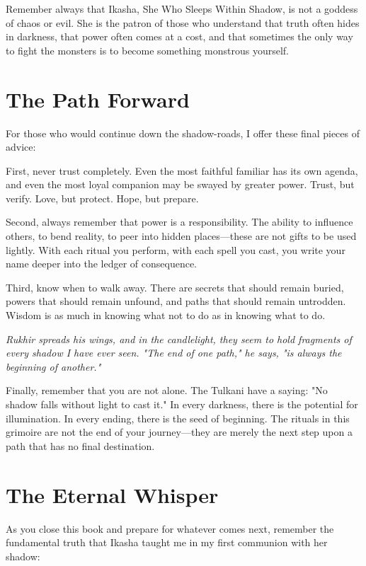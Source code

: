 \documentclass[12pt,twoside]{book}
\newcommand{\shadow}[1]{\textit{#1}}
\begin{document}
Remember always that Ikasha, She Who Sleeps Within Shadow, is not a goddess of chaos or evil. She is the patron of those who understand that truth often hides in darkness, that power often comes at a cost, and that sometimes the only way to fight the monsters is to become something monstrous yourself.

\section*{The Path Forward}

For those who would continue down the shadow-roads, I offer these final pieces of advice:

First, never trust completely. Even the most faithful familiar has its own agenda, and even the most loyal companion may be swayed by greater power. Trust, but verify. Love, but protect. Hope, but prepare.

Second, always remember that power is a responsibility. The ability to influence others, to bend reality, to peer into hidden places—these are not gifts to be used lightly. With each ritual you perform, with each spell you cast, you write your name deeper into the ledger of consequence.

Third, know when to walk away. There are secrets that should remain buried, powers that should remain unfound, and paths that should remain untrodden. Wisdom is as much in knowing what not to do as in knowing what to do.

\shadow{Rukhir spreads his wings, and in the candlelight, they seem to hold fragments of every shadow I have ever seen. "The end of one path," he says, "is always the beginning of another."}

Finally, remember that you are not alone. The Tulkani have a saying: "No shadow falls without light to cast it." In every darkness, there is the potential for illumination. In every ending, there is the seed of beginning. The rituals in this grimoire are not the end of your journey—they are merely the next step upon a path that has no final destination.

\section*{The Eternal Whisper}

As you close this book and prepare for whatever comes next, remember the fundamental truth that Ikasha taught me in my first communion with her shadow:
\end{document}
